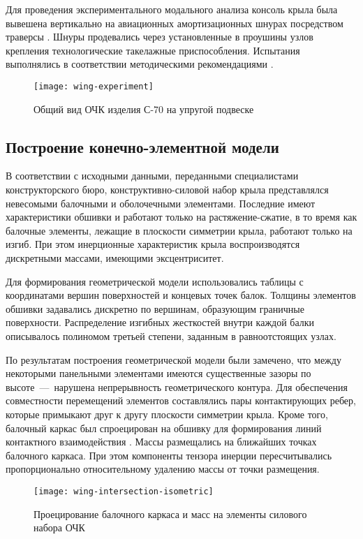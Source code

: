 Для проведения экспериментального модального анализа консоль крыла была вывешена вертикально на авиационных амортизационных шнурах посредством траверсы . Шнуры продевались через установленные в проушины узлов крепления технологические такелажные приспособления. Испытания выполнялись в соответствии методическими рекомендациями \cite{lib:aprobation:Moskalik}. 

\begin{figure}[H]
	\centerfloat
	\texttt{[image: wing-experiment]}
	\caption{Общий вид ОЧК изделия \mbox{С-70} на упругой подвеске} \label{fig:wing-experiment}
\end{figure}

\subsection{Построение конечно-элементной модели}

В соответствии с исходными данными, переданными специалистами конструкторского бюро, конструктивно-силовой набор крыла представлялся невесомыми балочными и оболочечными элементами. Последние имеют характеристики обшивки и работают только на растяжение-сжатие, в то время как балочные элементы, лежащие в плоскости симметрии крыла, работают только на изгиб. При этом инерционные характеристик крыла воспроизводятся дискретными массами, имеющими эксцентриситет.

Для формирования геометрической модели использовались таблицы с координатами вершин поверхностей и концевых точек балок. Толщины элементов обшивки задавались дискретно по вершинам, образующим граничные поверхности. Распределение изгибных жесткостей внутри каждой балки описывалось полиномом третьей степени, заданным в равноотстоящих узлах. 

По результатам построения геометрической модели были замечено, что между некоторыми панельными элементами имеются существенные зазоры по высоте~---~нарушена непрерывность геометрического контура. Для обеспечения совместности перемещений элементов составлялись пары контактирующих ребер, которые примыкают друг к другу плоскости симметрии крыла. Кроме того, балочный каркас был спроецирован на обшивку для формирования линий контактного взаимодействия . Массы размещались на ближайших точках балочного каркаса. При этом компоненты тензора инерции пересчитывались пропорционально относительному удалению массы от точки размещения. 

\begin{figure}[!htb]
	\centerfloat
	\texttt{[image: wing-intersection-isometric]}
	\caption{Проецирование балочного каркаса и масс на элементы силового набора ОЧК} \label{wing-intersection-isometric}
\end{figure}

